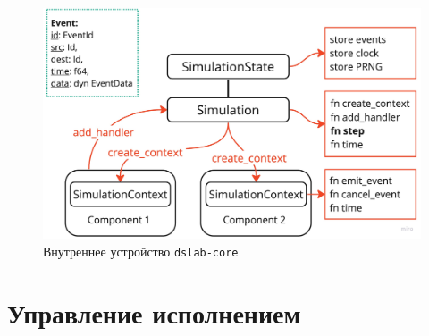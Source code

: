 \documentclass[t]{beamer}  %
\begin{document}
	\begin{frame}[fragile]
		\frametitle{\insertsection} 
		\framesubtitle{\insertsubsection}
		\vspace{-10pt}

		\begin{figure}
			\centering
			\includegraphics[width=\linewidth]{images/dslab_overview}
			\caption*{Внутреннее устройство \texttt{dslab-core}}
		\end{figure}
	\end{frame}

 \section{Управление исполнением}
\end{document}
